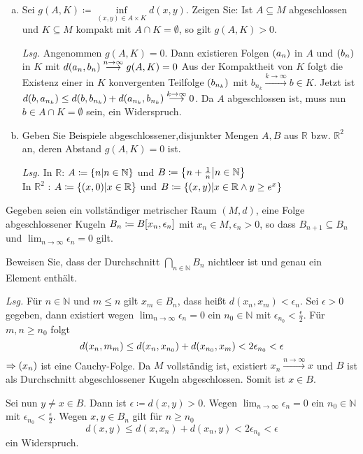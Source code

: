 \documentclass{scrreprt}
\begin{document}
\begin{enumerate}[a)]
\item Sei $g(A, K) \coloneqq \underset{(x, y) \in A \times K}\inf d(x, y)$.
  Zeigen Sie: Ist $A \subseteq M$ abgeschlossen und $K \subseteq M$ kompakt
  mit $A \cap K = \emptyset$, so gilt $g(A, K) > 0$.

  \textit{Lsg.} Angenommen $g(A, K) = 0$.
  Dann existieren Folgen $\qty(a_n)$ in $A$ und $\qty(b_n)$ in $K$
  mit $d\qty(a_n, b_n) \overset{n \to \infty}\longrightarrow g(A, K) = 0$
  Aus der Kompaktheit von $K$ folgt die Existenz einer in $K$
  konvergenten Teilfolge $\qty(b_{n_k})$ mit
  $b_{n_k} \overset{k \to \infty}\longrightarrow b \in K$.
  Jetzt ist $d\qty(b, a_{n_k}) \leq d\qty(b, b_{n_k}) + d(a_{n_k}, b_{n_k})
  \overset{k \to \infty}\longrightarrow 0$.
  Da $A$ abgeschlossen ist, muss nun $b \in A \cap K = \emptyset$ sein,
  ein Widerspruch.

\item Geben Sie Beispiele abgeschlossener,disjunkter Mengen $A, B$ aus
  $\mathbb{R}$ bzw. $\mathbb{R}^2$ an, deren Abstand $g(A, K) = 0$ ist.

  \textit{Lsg.} In $\mathbb{R}$: $A \coloneqq \qty{n \middle| n \in \mathbb{N}}$
  und $B \coloneqq \qty{n + \frac{1}{n} \middle| n \in \mathbb{N}}$ \\
  In $\mathbb{R}^2$ : $A \coloneqq \qty{(x, 0) \middle| x \in \mathbb{R}}$
  und $B \coloneqq \qty{(x, y) \middle| x \in \mathbb{R} \land y \geq e^x}$
\end{enumerate}

\newpage
\noindent
Gegeben seien ein vollständiger metrischer Raum $(M, d)$, eine Folge
abgeschlossener Kugeln $B_n \coloneqq B\qty[x_n, \epsilon_n]$ mit
$x_n \in M, \epsilon_n > 0$, so dass $B_{n + 1} \subseteq B_n$ und
$\lim_{n \to \infty} \epsilon_n = 0$ gilt.

Beweisen Sie, dass der Durchschnitt $\underset{n \in \mathbb{N}}\bigcap B_n$
nichtleer ist und genau ein Element enthält.

\textit{Lsg.} Für $n \in \mathbb{N}$ und $m \leq n$ gilt
$x_m \in B_n$, dass heißt $d(x_n, x_m) < \epsilon_n$.
Sei $\epsilon > 0$ gegeben, dann existiert wegen
$\lim_{n \to \infty} \epsilon_n = 0$ ein $n_0 \in \mathbb{N}$ mit
$\epsilon_{n_0} < \frac{\epsilon}{2}$.
Für $m, n \geq n_0$ folgt
\[
  d(x_n, m_m) \leq d\qty(x_n, x_{n_0}) + d\qty(x_{n_0}, x_m) < 2 \epsilon_{n_0} < \epsilon
\]
$\Rightarrow \qty(x_n)$ ist eine Cauchy-Folge.
Da $M$ vollständig ist, existiert $x_n \overset{n \to \infty}\longrightarrow x$
und $B$ ist als Durchschnitt abgeschlossener Kugeln abgeschlossen.
Somit ist $x \in B$.

Sei nun $y \ne x \in B$.
Dann ist $\epsilon \coloneqq d(x, y) > 0$.
Wegen $\lim_{n \to \infty} \epsilon_n = 0$ ein $n_0 \in \mathbb{N}$ mit
$\epsilon_{n_0} < \frac{\epsilon}{2}$.
Wegen $x, y \in B_n$ gilt für $n \geq n_0$
\[
  d(x, y) \leq d(x, x_n) + d(x_n, y) < 2 \epsilon_{n_0} < \epsilon
\]
ein Widerspruch.
\end{document}

